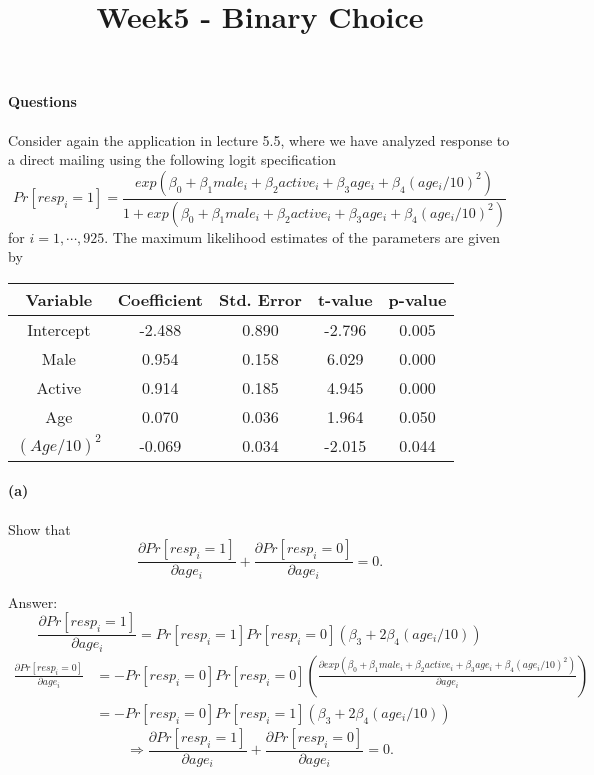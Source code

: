 \documentclass{article}
\title{Week5 - Binary Choice}
\date{}
\begin{document}
 
\maketitle

\paragraph{Questions}
Consider again the application in lecture 5.5, where we have analyzed response to a direct mailing using the following logit specification
\[
Pr[resp_i = 1] = \frac{exp(\beta_0 + \beta_1 male_i + \beta_2 active_i + \beta_3age_i + \beta_4(age_i/10)^2)}
					{1 + exp(\beta_0 + \beta_1 male_i + \beta_2 active_i + \beta_3age_i + \beta_4(age_i/10)^2)}
\]
for $i = 1, \cdots, 925$. The maximum likelihood estimates of the parameters are given by\\
\begin{center}
\begin{tabular}{ccccc}
	\toprule
	Variable& Coefficient& Std. Error& t-value& p-value\\
	\midrule
	Intercept& -2.488& 0.890& -2.796& 0.005\\
	Male& 0.954& 0.158& 6.029& 0.000\\
	Active& 0.914& 0.185& 4.945& 0.000\\
	Age& 0.070& 0.036& 1.964& 0.050\\
	$(Age/10)^2$& -0.069& 0.034& -2.015& 0.044\\
	\bottomrule
\end{tabular}
\end{center}

\paragraph{(a)}
Show that 
\[
\frac{\partial Pr[resp_i = 1]}{\partial age_i} + \frac{\partial Pr[resp_i = 0]}{\partial age_i} = 0.
\]

Answer:
\[
\frac{\partial Pr[resp_i = 1]}{\partial age_i} = Pr[resp_i = 1]Pr[resp_i = 0](\beta_3 + 2\beta_4(age_i/10))
\]
\[
\begin{aligned}
\frac{\partial Pr[resp_i = 0]}{\partial age_i} &= -Pr[resp_i = 0]Pr[resp_i = 0](\frac{\partial exp(\beta_0 + \beta_1 male_i + \beta_2 active_i + \beta_3 age_i + \beta_4(age_i/10)^2)}{\partial age_i})\\ &= -Pr[resp_i = 0]Pr[resp_i = 1](\beta_3 + 2\beta_4(age_i/10))
\end{aligned}
\]
\[
\Rightarrow \frac{\partial Pr[resp_i = 1]}{\partial age_i} + \frac{\partial Pr[resp_i = 0]}{\partial age_i} = 0.
\]
\end{document}
